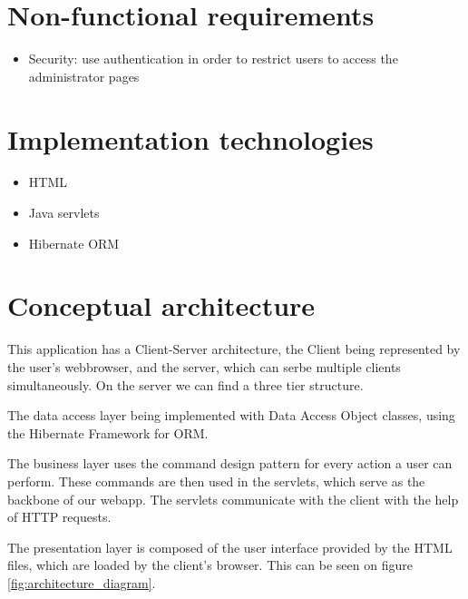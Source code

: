 \documentclass[a4paper,10pt]{report}
\begin{document}
\section{Non-functional requirements}
\begin{itemize}
    \item Security: use authentication in order to restrict users to access the administrator pages
\end{itemize}

\section{Implementation technologies}
\begin{itemize}
    \item HTML
    \item Java servlets
    \item Hibernate ORM
\end{itemize}

\section{Conceptual architecture}
This application has a Client-Server architecture, the Client being represented by the user's webbrowser, and the server, which can serbe multiple clients simultaneously.
On the server we can find a three tier structure.

The data access layer being implemented with Data Access Object classes, using the Hibernate Framework for ORM. 

The business layer uses the command design pattern for every action a user can perform.
These commands are then used in the servlets, which serve as the backbone of our webapp.
The servlets communicate with the client with the help of HTTP requests.

The presentation layer is composed of the user interface provided by the HTML files, which are loaded by the client's browser.
This can be seen on figure \ref{fig:architecture_diagram}.
\end{document}
